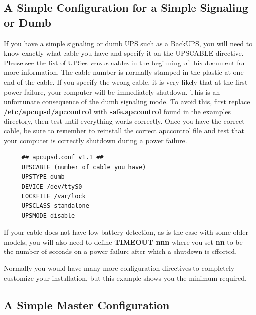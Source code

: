 \label{A-Simple-Configuration-for-a-Simple-Signaling-or-Dumb}

\subsection*{A Simple Configuration for a Simple Signaling or Dumb}

\label{index-Configuration_002c-dumb-71}
\label{index-dumb_002c-configuration-72}
\label{index-Example_002c-dumb-conf-73}
If you have a simple signaling or dumb UPS such as a BackUPS, you will need to
know exactly what cable you have and specify it on the UPSCABLE directive.
Please see the list of UPSes versus cables in the beginning of this document
for more information. The cable number is normally stamped in the plastic at
one end of the cable. If you specify the wrong cable, it is very likely that
at the first power failure, your computer will be immediately shutdown. This
is an unfortunate consequence of the dumb signaling mode.  To avoid this,
first replace {\bf /etc/apcupsd/apccontrol} with {\bf safe.apccontrol} found
in the examples directory, then test until everything works correctly. Once
you have the correct cable, be sure to remember to reinstall the correct
apccontrol file and test that your computer is correctly shutdown during a
power failure. 

\footnotesize
\begin{verbatim}
     ## apcupsd.conf v1.1 ##
     UPSCABLE (number of cable you have)
     UPSTYPE dumb
     DEVICE /dev/ttyS0
     LOCKFILE /var/lock
     UPSCLASS standalone
     UPSMODE disable
\end{verbatim}
\normalsize

If your cable does not have low battery detection, as is the case with some
older models, you will also need to define {\bf TIMEOUT nnn} where you set
{\bf nn} to be the number of seconds on a power failure after which a shutdown
is effected.  

Normally you would have many more configuration directives to completely
customize your installation, but this example shows you the minimum required. 

\label{A-Simple-Master-Configuration}

\subsection*{A Simple Master Configuration}

